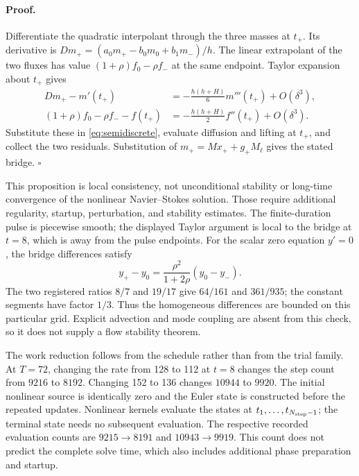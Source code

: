 \paragraph{Proof.}
Differentiate the quadratic interpolant through the three masses at
\(t_+\). Its derivative is
\(Dm_+=(a_0m_+-b_0m_0+b_1m_-)/h\).
The linear extrapolant of the two fluxes has value
\((1+\rho)f_0-\rho f_-\) at the same endpoint. Taylor expansion
about \(t_+\) gives
\begin{align}
 Dm_+-m'(t_+)
   &=-\frac{h(h+H)}{6}m'''(t_+)+O(\delta^3),
      \label{eq:bridge-derivative}\\
 (1+\rho)f_0-\rho f_- - f(t_+)
   &=-\frac{h(h+H)}{2}f''(t_+)+O(\delta^3).
      \label{eq:bridge-extrapolation}
\end{align}
Substitute these in \eqref{eq:semidiscrete}, evaluate diffusion and
lifting at \(t_+\), and collect the two residuals. Substitution of
\(m_+=Mx_++g_+M_\ell\) gives the stated bridge. \hfill\(\square\)

This proposition is local consistency, not unconditional stability
or long-time convergence of the nonlinear Navier--Stokes solution.
Those require additional regularity, startup, perturbation, and
stability estimates. The finite-duration pulse is piecewise smooth;
the displayed Taylor argument is local to the bridge at \(t=8\),
which is away from the pulse endpoints. For the scalar zero equation
\(y'=0\), the bridge differences satisfy
\begin{equation}
 y_+-y_0=\frac{\rho^2}{1+2\rho}(y_0-y_-).
 \label{eq:zero-equation}
\end{equation}
The two registered ratios \(8/7\) and \(19/17\) give
\(64/161\) and \(361/935\); the constant segments have factor
\(1/3\). Thus the homogeneous differences are bounded on this
particular grid. Explicit advection and mode coupling are absent
from this check, so it does not supply a flow stability theorem.

The work reduction follows from the schedule rather than from the
trial family. At \(T=72\), changing the rate from 128 to 112 at
\(t=8\) changes the step count from \(9216\) to \(8192\).
Changing 152 to 136 changes \(10944\) to \(9920\). The initial
nonlinear source is identically zero and the Euler state is constructed
before the repeated updates. Nonlinear kernels evaluate the states
at \(t_1,\ldots,t_{N_{\rm step}-1}\); the terminal state needs no
subsequent evaluation. The respective
recorded evaluation counts are \(9215\to8191\) and
\(10943\to9919\). This count does not predict the complete solve
time, which also includes additional phase preparation and startup.

